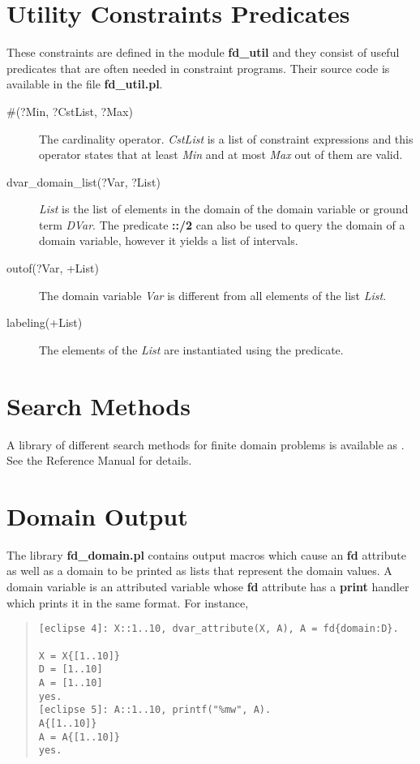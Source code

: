 \section{Utility Constraints Predicates}
These constraints are defined in the module {\bf fd\_util}
and they consist of useful predicates that are often
needed in constraint programs.
Their source code is available in the file {\bf fd\_util.pl}.

\begin{description}
\item[\#(?Min, ?CstList, ?Max)]
The cardinality operator.
{\it CstList} is a list of constraint expressions and this operator
states that at least {\it Min} and at most {\it Max} out of them
are valid.

\item[dvar\_domain\_list(?Var, ?List)]
{\it List} is the list of elements in the domain of the domain variable
or ground term {\it DVar}.
The predicate {\bf ::/2} can also be used to query the domain
of a domain variable, however it yields a list of intervals.

\item[outof(?Var, +List)]
The domain variable {\it Var} is different from all elements
of the list {\it List}.

\item[labeling(+List)]
The elements of the {\it List} are instantiated using the
 predicate.

\end{description}

\section{Search Methods}

A library of different search methods for finite domain problems
is available as
.
See the Reference Manual for details.


\section{Domain Output}
The library {\bf fd\_domain.pl} contains output macros which
cause an {\bf fd} attribute as well as a domain to be printed
as lists that represent the domain values.
A domain variable is an attributed variable whose {\bf fd} attribute
has a {\bf print} handler which prints it in the same format.
For instance,
\begin{quote}
\begin{verbatim}
[eclipse 4]: X::1..10, dvar_attribute(X, A), A = fd{domain:D}.

X = X{[1..10]}
D = [1..10]
A = [1..10]
yes.
[eclipse 5]: A::1..10, printf("%mw", A).
A{[1..10]}
A = A{[1..10]}
yes.
\end{verbatim}
\end{quote}

